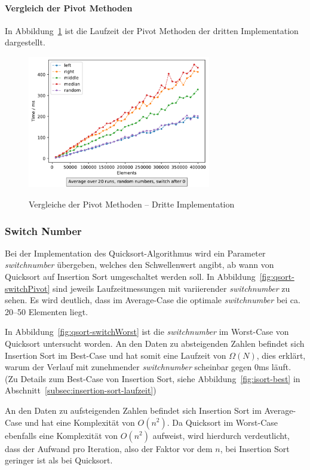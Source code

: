 \paragraph{Vergleich der Pivot Methoden}

In Abbildung~\ref{fig:qsort-impl3-2} ist die Laufzeit der Pivot Methoden der
dritten Implementation dargestellt.

\begin{figure}[hbt]
    \centering
    \caption{Vergleiche der Pivot Methoden -- Dritte Implementation}
    \includegraphics[width=8cm]
    {../out/pivotMethods.pdf}\label{fig:qsort-impl3-2}
\end{figure}

\FloatBarrier

\subsubsection{Switch Number}\label{subsubsec:switch-number}
Bei der Implementation des Quicksort-Algorithmus wird ein Parameter
\textit{switchnumber} übergeben, welches den Schwellenwert angibt, ab wann
von Quicksort auf Insertion Sort umgeschaltet werden soll.
In Abbildung~\ref{fig:qsort-switchPivot} sind
jeweils Laufzeitmessungen mit variierender \textit{switchnumber} zu sehen.
Es wird deutlich, dass im Average-Case die optimale \textit{switchnumber} bei
ca. 20--50 Elementen liegt.

In Abbildung~\ref{fig:qsort-switchWorst} ist die \textit{switchnumber} im
Worst-Case von Quicksort untersucht worden.
An den Daten zu absteigenden Zahlen befindet sich Insertion Sort im Best-Case
und hat somit eine Laufzeit von \(\Omega(N)\), dies erklärt, warum der
Verlauf mit zunehmender \textit{switchnumber} scheinbar gegen 0ms läuft.
(Zu Details zum Best-Case von Insertion Sort, siehe
Abbildung~\ref{fig:isort-best} in
Abschnitt~\ref{subsec:insertion-sort-laufzeit})

An den Daten zu aufsteigenden Zahlen befindet sich Insertion Sort im
Average-Case und hat eine Komplexität von \(O(n^2)\).
Da Quicksort im Worst-Case ebenfalls eine Komplexität von \(O(n^2)\)
aufweist, wird hierdurch verdeutlicht, dass der Aufwand pro Iteration, also
der Faktor vor dem \(n\), bei Insertion Sort geringer ist als bei Quicksort.

